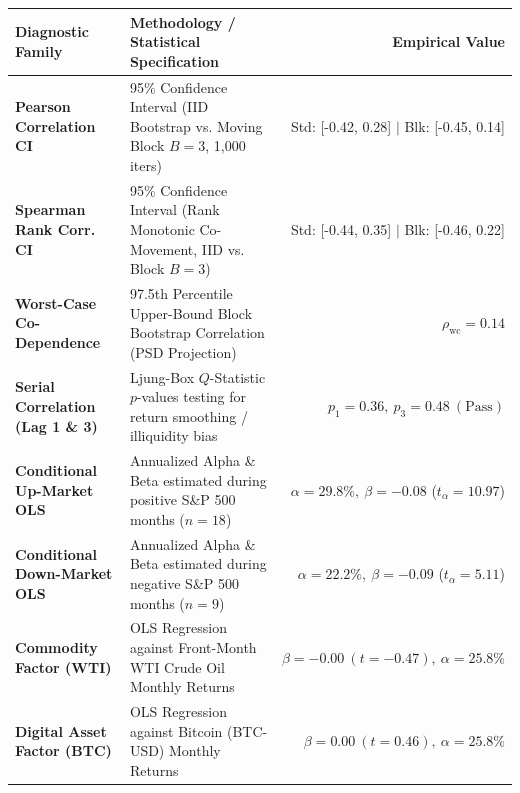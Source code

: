 \documentclass[10pt,a4paper]{article}
\begin{document}
\vspace{0.45em}

\begin{tcolorbox}[colback=white, colframe=primary, title=\textbf{\small\strut Appendix A: Extended Statistical, Bootstrap \& Factor Diagnostics}, fonttitle=\sffamily\bfseries\small, arc=5pt, boxrule=0.8pt, toptitle=4pt, bottomtitle=4pt, left=6pt, right=6pt, top=3.5pt, bottom=3.5pt, colbacktitle=primary]
\renewcommand{\arraystretch}{1.22}
\scriptsize
\begin{tabularx}{\textwidth}{l X r}
\toprule
\textbf{\textcolor{primary}{Diagnostic Family}} & \textbf{\textcolor{primary}{Methodology / Statistical Specification}} & \textbf{\textcolor{primary}{Empirical Value}} \\
\midrule
\textbf{Pearson Correlation CI} & 95\% Confidence Interval (IID Bootstrap vs. Moving Block $B=3$, 1,000 iters) & Std: [-0.42, 0.28] $\vert$ Blk: [-0.45, 0.14] \\
\rowcolor{cardbg} \textbf{Spearman Rank Corr. CI} & 95\% Confidence Interval (Rank Monotonic Co-Movement, IID vs. Block $B=3$) & Std: [-0.44, 0.35] $\vert$ Blk: [-0.46, 0.22] \\
\textbf{Worst-Case Co-Dependence} & 97.5th Percentile Upper-Bound Block Bootstrap Correlation (PSD Projection) & $\rho_{\text{wc}} = 0.14$ \\
\rowcolor{cardbg} \textbf{Serial Correlation (Lag 1 \& 3)} & Ljung-Box $Q$-Statistic $p$-values testing for return smoothing / illiquidity bias & $p_1=0.36,\ p_3=0.48\ (\text{Pass})$ \\
\textbf{Conditional Up-Market OLS} & Annualized Alpha \& Beta estimated during positive S\&P 500 months ($n=18$) & $\alpha=29.8\%,\ \beta=-0.08$ ($t_\alpha=10.97$) \\
\rowcolor{cardbg} \textbf{Conditional Down-Market OLS} & Annualized Alpha \& Beta estimated during negative S\&P 500 months ($n=9$) & $\alpha=22.2\%,\ \beta=-0.09$ ($t_\alpha=5.11$) \\
\textbf{Commodity Factor (WTI)} & OLS Regression against Front-Month WTI Crude Oil Monthly Returns & $\beta=-0.00\ (t=-0.47),\ \alpha=25.8\%$ \\
\rowcolor{cardbg} \textbf{Digital Asset Factor (BTC)} & OLS Regression against Bitcoin (BTC-USD) Monthly Returns & $\beta=0.00\ (t=0.46),\ \alpha=25.8\%$ \\
\bottomrule
\end{tabularx}
\end{tcolorbox}
\end{document}
